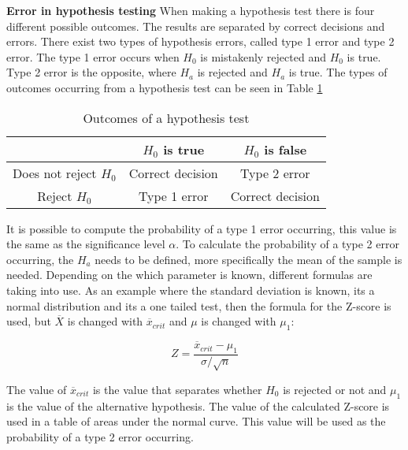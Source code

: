 \noindent \textbf{Error in hypothesis testing}
\newline
When making a hypothesis test there is four different possible outcomes. The results are separated by correct decisions and errors. There exist two types of hypothesis errors, called type 1 error and type 2 error. The type 1 error occurs when $H_0$ is mistakenly rejected and $H_0$ is true. Type 2 error is the opposite, where $H_a$ is rejected and $H_a$ is true. The types of outcomes occurring from a hypothesis test can be seen in Table \ref{tab:example2x3}
\begin{table}[h!]
	\centering
	\begin{tabular}{|c|c|c|}
		\hline
		 & $H_0$ is true & $H_0$ is false \\
		\hline
		Does not reject $H_0$ & Correct decision & Type 2 error \\ \hline
		Reject $H_0$ & Type 1 error & Correct decision \\
		\hline
	\end{tabular}
	\caption{Outcomes of a hypothesis test}
	\label{tab:example2x3}
\end{table}

\noindent It is possible to compute the probability of a type 1 error occurring, this value is the same as the significance level $\alpha$. To calculate the probability of a type 2 error occurring, the $H_a$ needs to be defined, more specifically the mean of the sample is needed. Depending on the which parameter is known, different formulas are taking into use. As an example where the standard deviation is known, its a normal distribution and its a one tailed test, then the formula for the Z-score is used, but $\overline{X}$ is changed with $\overline{x}_{crit}$ and $\mu$ is changed with $\mu_1$:

\begin{equation}
Z=\frac{\overline{x}_{crit}-\mu_1}{\sigma/\sqrt{n}}
\end{equation}


\noindent The value of $\overline{x}_{crit}$ is the value that separates whether $H_0$ is rejected or not and $\mu_1$ is the value of the alternative hypothesis.
The value of the calculated Z-score is used in a table of areas under the normal curve. This value will be used as the probability of a type 2 error occurring.


